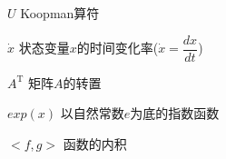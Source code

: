 
\begin{listofnotations}
  \item [$U$] Koopman算符
  \item [$\dot{x}$] 状态变量$x$的时间变化率($\dot{x}=\dfrac{dx}{dt}$)
  \item [$A^{\mathrm T}$] 矩阵$A$的转置
  \item [$exp(x)$] 以自然常数$e$为底的指数函数
  \item [$<f,g>$] 函数的内积
\end{listofnotations}
